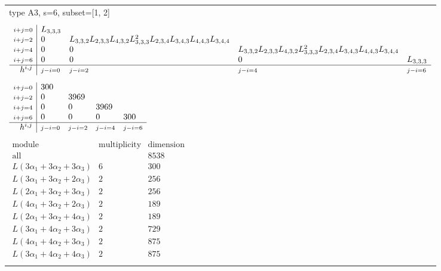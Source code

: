 \documentclass[crop,border=2mm]{standalone}
\begin{document}
\begin{tabular}{l}
{\huge type A3, s=6, subset=[1, 2]}\\ \\


$\displaystyle
\begin{array}{r|l l l l}
	{\scriptstyle i+j=0}&L_{3,3,3}&&&\\
	{\scriptstyle i+j=2}&0&L_{3,3,2}L_{2,3,3}L_{4,3,2}L_{3,3,3}^{2}L_{2,3,4}L_{3,4,3}L_{4,4,3}L_{3,4,4}&&\\
	{\scriptstyle i+j=4}&0&0&L_{3,3,2}L_{2,3,3}L_{4,3,2}L_{3,3,3}^{2}L_{2,3,4}L_{3,4,3}L_{4,4,3}L_{3,4,4}&\\
	{\scriptstyle i+j=6}&0&0&0&L_{3,3,3}\\
	\hline h^{i,j}&{\scriptstyle j-i=0}&{\scriptstyle j-i=2}&{\scriptstyle j-i=4}&{\scriptstyle j-i=6}
\end{array}
$ \\ \\


$\displaystyle
\begin{array}{r|l l l l}
	{\scriptstyle i+j=0}&300&&&\\
	{\scriptstyle i+j=2}&0&3969&&\\
	{\scriptstyle i+j=4}&0&0&3969&\\
	{\scriptstyle i+j=6}&0&0&0&300\\
	\hline h^{i,j}&{\scriptstyle j-i=0}&{\scriptstyle j-i=2}&{\scriptstyle j-i=4}&{\scriptstyle j-i=6}
\end{array}
$ \\ \\


$\displaystyle
\begin{array}{rll}
	\text{module}&\text{multiplicity}&\text{dimension} \\ \hline \text{all}&&8538 \\
	L\left( 3\alpha_{1}+ 3\alpha_{2}+ 3\alpha_{3}\right)&6&300\\
	L\left( 3\alpha_{1}+ 3\alpha_{2}+ 2\alpha_{3}\right)&2&256\\
	L\left( 2\alpha_{1}+ 3\alpha_{2}+ 3\alpha_{3}\right)&2&256\\
	L\left( 4\alpha_{1}+ 3\alpha_{2}+ 2\alpha_{3}\right)&2&189\\
	L\left( 2\alpha_{1}+ 3\alpha_{2}+ 4\alpha_{3}\right)&2&189\\
	L\left( 3\alpha_{1}+ 4\alpha_{2}+ 3\alpha_{3}\right)&2&729\\
	L\left( 4\alpha_{1}+ 4\alpha_{2}+ 3\alpha_{3}\right)&2&875\\
	L\left( 3\alpha_{1}+ 4\alpha_{2}+ 4\alpha_{3}\right)&2&875
\end{array}
$ \\ \\

\end{tabular}
\end{document}
